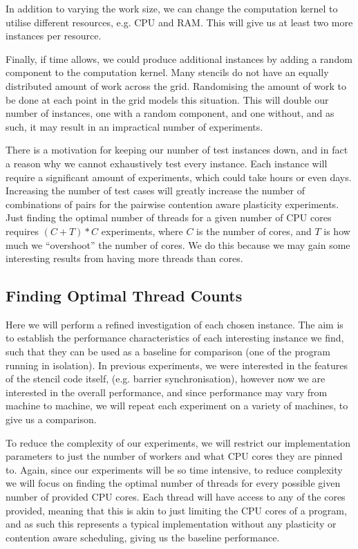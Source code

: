 In addition to varying the work size, we can change the computation kernel to utilise different resources, e.g. CPU and RAM. This will give us at least two more instances per resource. 

Finally, if time allows, we could produce additional instances by adding a random component to the computation kernel. Many stencils do not have an equally distributed amount of work across the grid. Randomising the amount of work to be done at each point in the grid models this situation. This will double our number of instances, one with a random component, and one without, and as such, it may result in an impractical number of experiments.

There is a motivation for keeping our number of test instances down, and in fact a reason why we cannot exhaustively test every instance. Each instance will require a significant amount of experiments, which could take hours or even days. Increasing the number of test cases will greatly increase the number of combinations of pairs for the pairwise contention aware plasticity experiments. Just finding the optimal number of threads for a given number of CPU cores requires $(C + T) * C$ experiments, where $C$ is the number of cores, and $T$ is how much we ``overshoot'' the number of cores. We do this because we may gain some interesting results from having more threads than cores.



\subsection{Finding Optimal Thread Counts}
\label{section:design:optimal_threads}

Here we will perform a refined investigation of each chosen instance. The aim is to establish the performance characteristics of each interesting instance we find, such that they can be used as a baseline for comparison (one of the program running in isolation). In previous experiments, we were interested in the features of the stencil code itself, (e.g. barrier synchronisation), however now we are interested in the overall performance, and since performance may vary from machine to machine, we will repeat each experiment on a variety of machines, to give us a comparison.

To reduce the complexity of our experiments, we will restrict our implementation parameters to just the number of workers and what CPU cores they are pinned to. Again, since our experiments will be so time intensive, to reduce complexity we will focus on finding the optimal number of threads for every possible given number of provided CPU cores. Each thread will have access to any of the cores provided, meaning that this is akin to just limiting the CPU cores of a program, and as such this represents a typical implementation without any plasticity or contention aware scheduling, giving us the baseline performance.



